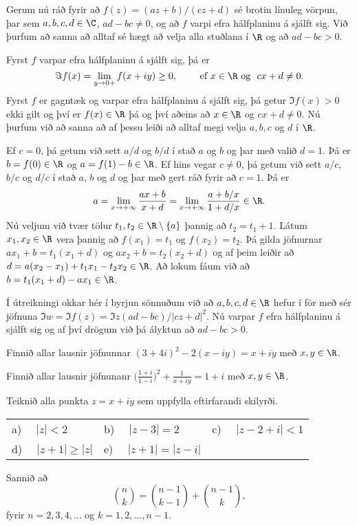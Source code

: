 \smallskip
Gerum nú ráð fyrir að $f(z)=(az+b)/(cz+d)$ sé brotin línuleg vörpun,
þar sem $a,b,c,d\in \C$, $ad-bc\neq 0$, og að $f$ varpi efra
hálfplaninu á sjálft sig. Við þurfum að sanna að  alltaf sé
hægt að velja alla stuðlana í $\R$ og að  $ad-bc>0$.

\smallskip
Fyrst $f$ varpar efra hálfplaninu á sjálft sig, þá er
$$
\Im f(x)=\lim_{y\to 0+}f(x+iy)\geq 0, \qquad \text{ ef } x\in \R
\ \text{og } \ cx+d\neq 0.
$$ 
Fyrst $f$ er gagntæk og  varpar efra hálfplaninu á sjálft sig,
þá getur $\Im f(x)>0$ ekki gilt og því er
$f(x)\in \R$ þá og því aðeins að $x\in \R$ og $cx+d\neq 0$.  
Nú þurfum við að sanna að
af þessu leiði að alltaf megi velja $a,b,c$ og $d$ í $\R$.

Ef $c=0$, þá getum við sett $a/d$ og $b/d$ í stað $a$ og $b$ og þar
með  valið $d=1$.  Þá er $b=f(0)\in \R$ og $a=f(1)-b\in \R$.  Ef hins vegar
$c\neq 0$, þá getum við sett $a/c$, $b/c$ og $d/c$ í stað $a$, $b$ og
$d$ og þar með gert ráð fyrir að $c=1$.  Þá er 
$$
a=\lim_{x\to +\infty}\dfrac{ax+b}{x+d}=\lim_{x\to
+\infty}\dfrac{a+b/x}{1+d/x}\in \R.
$$
Nú veljum við tvær tölur $t_1,t_2\in \R\setminus\{a\}$ þannig að 
$t_2=t_1+1$.  Látum $x_1,x_2\in \R$ vera þannig að
$f(x_1)=t_1$ og $f(x_2)=t_2$.  Þá gilda jöfnurnar
$ax_1+b=t_1(x_1+d)$ og $ax_2+b=t_2(x_2+d)$ og af þeim leiðir
að $d=a(x_2-x_1)+t_1x_1-t_2x_2\in \R$.  Að lokum fáum við að
$b=t_1(x_1+d)-ax_1 \in \R$.

Í útreikningi okkar hér í byrjun sönnuðum  við að
$a,b,c,d\in \R$ hefur í för með sér jöfnuna
$\Im w = \Im f(z)=\Im z(ad-bc)/|cz+d|^2$. Nú varpar 
$f$ efra hálfplaninu  á sjálft sig og af því drögum við 
þá ályktun að  $ad-bc>0$.



\vfill\eject

\aefing

\daemi Finnið allar lausnir jöfnunnar $(3+4i)^2 - 2(x-iy) = x+iy$
með $x,y\in \R$.

\daemi Finnið allar lausnir jöfnunanr 
$\big(\frac{1+i}{1-i}\big)^2 + \frac{1}{x+iy} = 1+i$
með $x,y\in \R$.

\daemi Teiknið alla punkta $z=x+iy$ sem uppfylla eftirfarandi skilyrði.


\begin{tabular}{lll}
a) \ \  $|z|<2$ & b) \ \ $|z-3|=2$ &c) \ \  $|z-2+i|<1$ \\
d) \ \  $|z+1|\geq |z|$ & e) \ \  $|z+1| = |z-i|$
\end{tabular}

\daemi Sannið að 
$$
\binom nk=\binom{n-1}{k-1}+\binom{n-1}k, 
$$
fyrir $n=2,3,4,\dots$ og $k=1,2,\dots,n-1$.


